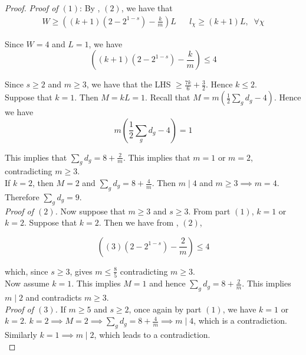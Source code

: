\documentclass[12pt,twoside,]{amsart}
\theoremstyle{plain}
\theoremstyle{definition}
\begin{document}
\begin{proof}
  \noindent\textit{Proof of $(1)$}:  By , $(2)$, we have that 
    \begin{align*}
    W \geq \left( (k+1)(2 -2^{1-s})- \frac{k}{m}\right)L &&
l_\chi \geq (k+1)L, \; \; \forall \chi
\end{align*}

Since $W = 4$ and $L = 1$, we have 
\begin{equation*}
    \left( (k+1)(2 -2^{1-s})- \frac{k}{m}\right) \leq 4
\end{equation*}

Since $s \geq 2$ and $m \geq 3$, we have that the LHS $ \geq \displaystyle\frac{7k}{6}+\frac{3}{2}$. Hence $k \leq 2$. \\

Suppose that $k = 1$. Then $M = kL = 1$. Recall that $M = m(\displaystyle\frac{1}{2} \sum_g d_g-4)$. Hence we have 
\begin{equation*}
m(\displaystyle\frac{1}{2} \sum_g d_g-4) = 1
\end{equation*}

This implies that $\sum_g d_g = 8+\displaystyle\frac{2}{m}$. This implies that $m = 1$ or $m = 2$, contradicting $m \geq 3$. \\

If $k = 2$, then $M = 2$ and $\sum_g d_g = 8+\displaystyle\frac{4}{m}$. Then $m \mid 4$ and $m \geq 3 \implies m = 4$. Therefore $\sum_g d_g = 9$. \\

\noindent\textit{Proof of $(2)$.} Now suppose that $m \geq 3$ and $s \geq 3$. From part $(1)$, $k = 1$ or $k = 2$. Suppose that $k = 2$. Then we have from , $(2)$, 

\begin{equation*}
    \left( (3)(2 -2^{1-s})- \frac{2}{m}\right) \leq 4
\end{equation*}

which, since $s \geq 3$, gives $m \leq \displaystyle\frac{8}{5}$ contradicting $m \geq 3$. \\
Now assume $k = 1$. This implies $M = 1$ and hence $\sum_g d_g = 8+\displaystyle\frac{2}{m}$. This implies $m \mid 2$ and contradicts $m \geq 3$. \\

\noindent\textit{Proof of $(3)$.} If $m \geq 5$ and $s \geq 2$, once again by part $(1)$, we have $k = 1$ or $k = 2$. $k = 2 \implies M = 2 \implies \sum_g d_g = 8+\displaystyle\frac{4}{m} \implies m \mid 4$, which is a contradiction. Similarly $k = 1 \implies m \mid 2$, which leads to a contradiction. \\






\end{proof}
\end{document}

